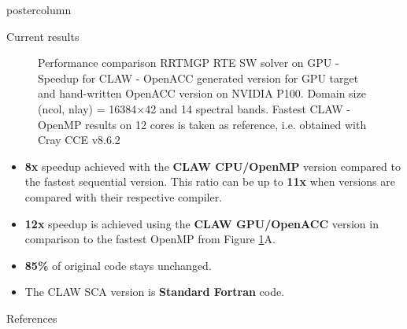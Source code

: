 \documentclass{beamer}
\begin{document}
\begin{frame}
\begin{columns}
\begin{column}{.57\textwidth}
\begin{beamercolorbox}[center]{postercolumn}
\begin{minipage}{.98\textwidth}
{\begin{myblock}{Current results}
\begin{figure}[ht]
  \caption[Performance comparison RRTMGP RTE SW solver on GPU]{Performance comparison RRTMGP RTE
  SW solver on GPU - Speedup for CLAW - OpenACC generated version for GPU target and hand-written
  OpenACC version on NVIDIA P100. Domain size (ncol, nlay) = 16384$\times$42 and 14 spectral bands.
  Fastest CLAW - OpenMP results on 12 cores is taken as reference, i.e.
  obtained with Cray CCE v8.6.2}
  \label{fig:perf_sw}
\end{figure}

\begin{itemize}
  \item \textbf{8x} speedup achieved with the \textbf{CLAW CPU/OpenMP} version
        compared to the fastest sequential version. This ratio can be up to
        \textbf{11x} when versions are compared with their respective compiler.
  \item \textbf{12x} speedup is achieved using the \textbf{CLAW GPU/OpenACC}
        version in comparison to the fastest OpenMP from
        Figure \ref{fig:perf_sw}A.
  \item \textbf{85\%} of original code stays unchanged.
  \item The CLAW SCA version is \textbf{Standard Fortran} code.
\end{itemize}

\end{myblock}\vfill

%
%
\begin{myblock}{References}
\footnotesize


\end{myblock}\vfill


}\end{minipage}\end{beamercolorbox}
\end{column}
\end{columns}
\end{frame}
\end{document}
